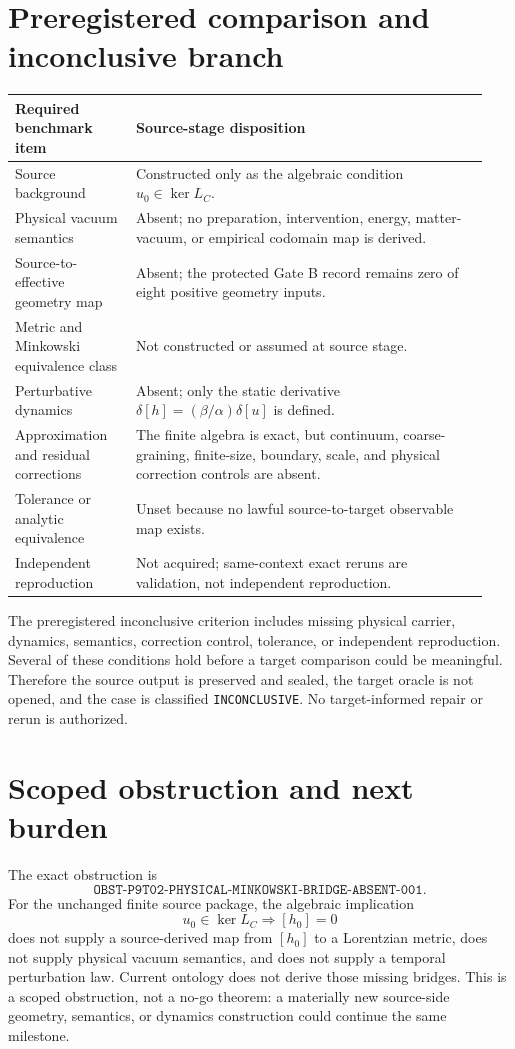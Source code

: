 \documentclass[11pt]{article}
\begin{document}
\section{Preregistered comparison and inconclusive branch}

\begin{longtable}{p{0.24\linewidth}p{0.70\linewidth}}
\toprule
Required benchmark item & Source-stage disposition\\
\midrule
Source background &
Constructed only as the algebraic condition \(u_0\in\ker L_C\).\\
Physical vacuum semantics &
Absent; no preparation, intervention, energy, matter-vacuum, or empirical
codomain map is derived.\\
Source-to-effective geometry map &
Absent; the protected Gate B record remains zero of eight positive geometry
inputs.\\
Metric and Minkowski equivalence class &
Not constructed or assumed at source stage.\\
Perturbative dynamics &
Absent; only the static derivative
\(\delta[h]=(\beta/\alpha)\delta[u]\) is defined.\\
Approximation and residual corrections &
The finite algebra is exact, but continuum, coarse-graining, finite-size,
boundary, scale, and physical correction controls are absent.\\
Tolerance or analytic equivalence &
Unset because no lawful source-to-target observable map exists.\\
Independent reproduction &
Not acquired; same-context exact reruns are validation, not independent
reproduction.\\
\bottomrule
\end{longtable}

The preregistered inconclusive criterion includes missing physical carrier,
dynamics, semantics, correction control, tolerance, or independent
reproduction.  Several of these conditions hold before a target comparison
could be meaningful.  Therefore the source output is preserved and sealed,
the target oracle is not opened, and the case is classified
\texttt{INCONCLUSIVE}.  No target-informed repair or rerun is authorized.

\section{Scoped obstruction and next burden}

The exact obstruction is
\[
 \texttt{OBST-P9T02-PHYSICAL-MINKOWSKI-BRIDGE-ABSENT-001}.
\]
For the unchanged finite source package, the algebraic implication
\[
  u_0\in\ker L_C\Longrightarrow [h_0]=0
\]
does not supply a source-derived map from \([h_0]\) to a Lorentzian metric,
does not supply physical vacuum semantics, and does not supply a temporal
perturbation law.  Current ontology does not derive those missing bridges.
This is a scoped obstruction, not a no-go theorem: a materially new
source-side geometry, semantics, or dynamics construction could continue the
same milestone.
\end{document}
